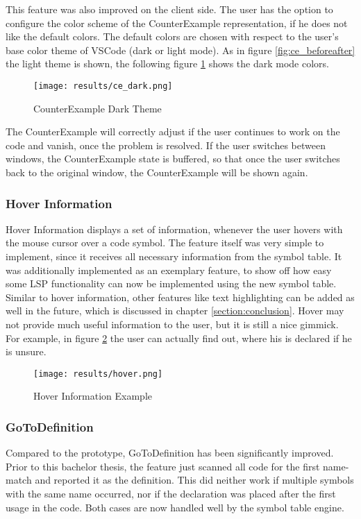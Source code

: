 This feature was also improved on the client side.
The user has the option to configure the color scheme of the CounterExample representation, if he does not like the default colors.
The default colors are chosen with respect to the user's base color theme of VSCode (dark or light mode).
As in figure \ref{fig:ce_beforeafter} the light theme is shown,
the following figure \ref{fig:ce_dark} shows the dark mode colors.

\begin{figure}[H]
    \centering
    \texttt{[image: results/ce\_dark.png]}
    \caption{CounterExample Dark Theme}
    \label{fig:ce_dark}
\end{figure}

The CounterExample will correctly adjust if the user continues to work on the code and vanish, once the problem is resolved.
If the user switches between windows, the CounterExample state is buffered, so that once the user switches back to the original window, the CounterExample will be shown again.

\subsubsection{Hover Information}
Hover Information displays a set of information, whenever the user hovers with the mouse cursor over a code symbol.
The feature itself was very simple to implement, since it receives all necessary information from the symbol table.
It was additionally implemented as an exemplary feature, to show off how easy some LSP functionality can now be implemented using the new symbol table.
Similar to hover information, other features like text highlighting can be added as well in the future, which is discussed in chapter \ref{section:conclusion}.
Hover may not provide much useful information to the user, but it is still a nice gimmick.
For example, in figure \ref{fig:hover} the user can actually find out, where his  is declared if he is unsure.
\begin{figure}[H]
    \centering
    \texttt{[image: results/hover.png]}
    \caption{Hover Information Example}
    \label{fig:hover}
\end{figure}

\subsubsection{GoToDefinition}
Compared to the prototype, GoToDefinition has been significantly improved.
Prior to this bachelor thesis, the feature just scanned all code for the first name-match and reported it as the definition.
This did neither work if multiple symbols with the same name occurred, nor if the declaration was placed after the first usage in the code.
Both cases are now handled well by the symbol table engine.\\


